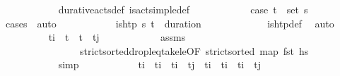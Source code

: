\begin{isabellebody}
\ \ \ \ \ \ \ \ \ \ \isamarkupfalse%
\ durative{\isacharunderscore}{\kern0pt}acts{\isacharunderscore}{\kern0pt}def\ is{\isacharunderscore}{\kern0pt}act{\isacharunderscore}{\kern0pt}simple{\isacharunderscore}{\kern0pt}def\isanewline
\ \ \ \ \ \ \ \ \ \ \isamarkupfalse%
\ {\isacartoucheopen}{\isacharquery}{\kern0pt}case{}{\isacartoucheclose}\ {\isacartoucheopen}{\isacharparenleft}{\kern0pt}t\isactrlsub {\isasympi}{\isacharcomma}{\kern0pt}{\isasympi}{\isacharparenright}{\kern0pt}\ {\isasymin}\ set\ {\isasympi}s{\isacartoucheclose}\ \isamarkupfalse%
\ {\isacharparenleft}{\kern0pt}cases\ {\isasympi}{\isacharparenright}{\kern0pt}\ auto\isanewline
\ \ \ \ \ \ \ \ \isamarkupfalse%
\ \isamarkupfalse%
\ {\isachardoublequoteopen}is{\isacharunderscore}{\kern0pt}htp\ {\isasympi}s\ {\isacharparenleft}{\kern0pt}t\isactrlsub {\isasympi}\ {\isacharplus}{\kern0pt}\ duration\ {\isasympi}{\isacharparenright}{\kern0pt}{\isachardoublequoteclose}\isanewline
\ \ \ \ \ \ \ \ \ \ \isamarkupfalse%
\ is{\isacharunderscore}{\kern0pt}htp{\isacharunderscore}{\kern0pt}def\ \isamarkupfalse%
\ auto\isanewline
\ \ \ \ \ \ \ \ \isamarkupfalse%
\ {\isachardoublequoteopen}t\isactrlsub i\ {\isacharless}{\kern0pt}\ t\ {\isasymand}\ t\ {\isacharless}{\kern0pt}\ t\isactrlsub j{\isachardoublequoteclose}\isanewline
\ \ \ \ \ \ \ \ \ \ \isamarkupfalse%
\ assms\ \isanewline
\ \ \ \ \ \ \ \ \ \ \ \ \ \ \ \ strict{\isacharunderscore}{\kern0pt}sorted{\isacharunderscore}{\kern0pt}drop{\isacharunderscore}{\kern0pt}leq{\isacharunderscore}{\kern0pt}take{\isacharunderscore}{\kern0pt}le{\isacharprime}{\kern0pt}{\isacharbrackleft}{\kern0pt}OF\ {\isacartoucheopen}strict{\isacharunderscore}{\kern0pt}sorted\ {\isacharparenleft}{\kern0pt}map\ fst\ hs{\isacharparenright}{\kern0pt}{\isacartoucheclose}{\isacharbrackright}{\kern0pt}\ \isanewline
\ \ \ \ \ \ \ \ \ \ \isamarkupfalse%
\ simp\isanewline
\ \ \ \ \ \ \ \ \isamarkupfalse%
\ \isamarkupfalse%
\ {\isachardoublequoteopen}{\isacharparenleft}{\kern0pt}t\isactrlsub i\ {\isasymle}\ t\isactrlsub i{\isacharprime}{\kern0pt}\ {\isasymand}\ t\isactrlsub i{\isacharprime}{\kern0pt}\ {\isasymle}\ t\isactrlsub j{\isacharparenright}{\kern0pt}\ {\isasymor}\ {\isacharparenleft}{\kern0pt}t\isactrlsub i{\isacharprime}{\kern0pt}\ {\isasymle}\ t\isactrlsub i\ {\isasymand}\ t\isactrlsub i\ {\isasymle}\ t\isactrlsub j{\isacharprime}{\kern0pt}{\isacharparenright}{\kern0pt}{\isachardoublequoteclose}\isanewline

\end{isabellebody}
